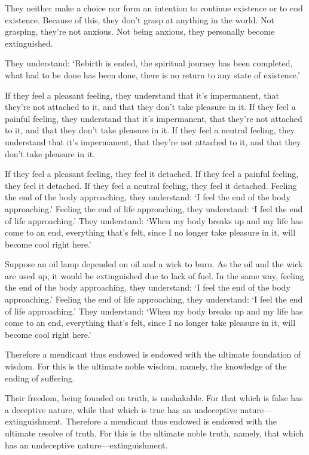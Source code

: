 \documentclass[12pt,openany]{book}%
\begin{document}
They neither make a choice nor form an intention to continue existence or to end existence. Because of this, they don’t grasp at anything in the world. Not grasping, they’re not anxious. Not being anxious, they personally become extinguished. 

They understand: ‘Rebirth is ended, the spiritual journey has been completed, what had to be done has been done, there is no return to any state of existence.’ 

If they feel a pleasant feeling, they understand that it’s impermanent, that they’re not attached to it, and that they don’t take pleasure in it. If they feel a painful feeling, they understand that it’s impermanent, that they’re not attached to it, and that they don’t take pleasure in it. If they feel a neutral feeling, they understand that it’s impermanent, that they’re not attached to it, and that they don’t take pleasure in it. 

If they feel a pleasant feeling, they feel it detached. If they feel a painful feeling, they feel it detached. If they feel a neutral feeling, they feel it detached. Feeling the end of the body approaching, they understand: ‘I feel the end of the body approaching.’ Feeling the end of life approaching, they understand: ‘I feel the end of life approaching.’ They understand: ‘When my body breaks up and my life has come to an end, everything that’s felt, since I no longer take pleasure in it, will become cool right here.’ 

Suppose an oil lamp depended on oil and a wick to burn. As the oil and the wick are used up, it would be extinguished due to lack of fuel. In the same way, feeling the end of the body approaching, they understand: ‘I feel the end of the body approaching.’ Feeling the end of life approaching, they understand: ‘I feel the end of life approaching.’ They understand: ‘When my body breaks up and my life has come to an end, everything that’s felt, since I no longer take pleasure in it, will become cool right here.’ 

Therefore a mendicant thus endowed is endowed with the ultimate foundation of wisdom. For this is the ultimate noble wisdom, namely, the knowledge of the ending of suffering. 

Their freedom, being founded on truth, is unshakable. For that which is false has a deceptive nature, while that which is true has an undeceptive nature—extinguishment. Therefore a mendicant thus endowed is endowed with the ultimate resolve of truth. For this is the ultimate noble truth, namely, that which has an undeceptive nature—extinguishment. 
\end{document}

